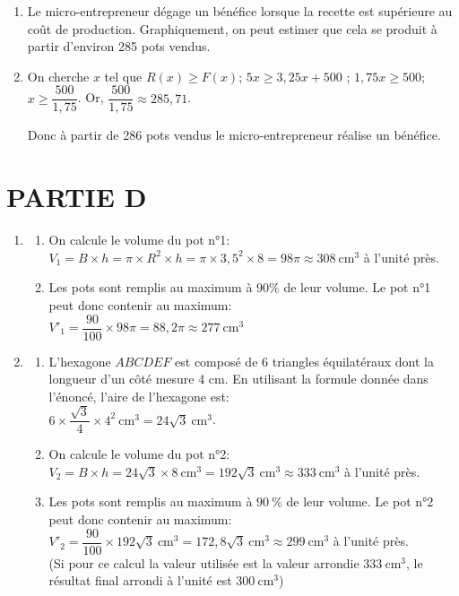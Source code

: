 \begin{enumerate}
\begin{enumerate}
        
        \item Le micro-entrepreneur dégage un bénéfice lorsque la recette est supérieure au coût de production. Graphiquement, on peut estimer que cela se produit à partir d'environ 285 pots vendus. 
        
        \item On cherche $x$ tel que $R(x)\geq F(x)$; $5x\geq 3,25x+500$ ; $1,75x\geq500$; $x\geq\dfrac{500}{1,75}$. Or,  $\dfrac{500}{1,75}\approx285,71$. 
        
        \medskip
        Donc à partir de 286 pots vendus le micro-entrepreneur réalise un bénéfice. 
        \end{enumerate}
 \end{enumerate}    
 \section*{\hspace{20mm}\textbf{PARTIE D}}
 \begin{enumerate}
    \item 
    \begin{enumerate}
        \item On calcule le volume du pot n°1:\\ $V_1=B\times h=\pi\times  R^2\times h=\pi\times3,5^2\times8= 98\pi\approx308~\text{cm}^3$ à l'unité près.
        \item Les pots sont remplis au maximum à $90\%$ de leur volume. Le pot n°1 peut donc contenir au maximum:\\$V'_1=\dfrac{90}{100}\times 98\pi=88,2\pi\approx277~\text{cm}^3$
    \end{enumerate}
    \item
    \begin{enumerate}
        \item L'hexagone $ABCDEF$ est composé de 6 triangles équilatéraux dont la longueur d'un côté mesure 4 cm. En utilisant la formule donnée dans l'énoncé, l'aire de l'hexagone est:\\ $6\times \dfrac{\sqrt{3}}{4}\times 4^2~\text{cm}^3= 24\sqrt{3}~\text{cm}^3$.
        
        \item On calcule le volume du pot n°2:\\$V_2=B\times h= 24\sqrt{3}\times8~\text{cm}^3=192\sqrt{3}~\text{cm}^3\approx333~\text{cm}^3$ à l'unité près.
        \item Les pots sont remplis au maximum à $90~\%$ de leur volume. Le pot n°2 peut donc contenir au maximum:\\$V'_2=\dfrac{90}{100}\times 192\sqrt{3}~\text{cm}^3=172,8\sqrt{3}~\text{cm}^3\approx299~\text{cm}^3$ à l'unité près.\\(Si pour ce calcul la valeur utilisée est la valeur arrondie $333~\text{cm}^3$, le résultat final arrondi à l'unité est $300~\text{cm}^3$)
        \end{enumerate}
\end{enumerate}        